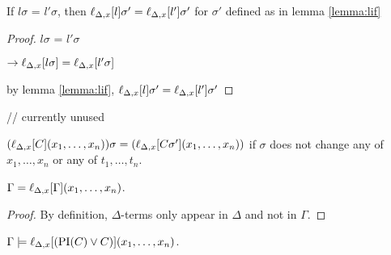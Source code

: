 \documentclass[,%
	paper=a4,%
	DIV14, 
	liststotoc,
	bibtotoc,
	draft=false,%
	numbers=noendperiod
]{scrartcl}
\newcommand{\lif}[1]{\lift{\Delta}{#1}{x}}
\begin{document}
\begin{lemma}
	\label{lemma:lif_literal}
	If $l\sigma$ = $l'\sigma$, then $\lif{l}\sigma' = \lif{l'}\sigma'$ for $\sigma'$ defined as in lemma \ref{lemma:lif}
\end{lemma}
\begin{proof}
	$l\sigma$ = $l'\sigma$

	$\ra \lif{l\sigma} = \lif{l'\sigma}$

	by lemma \ref{lemma:lif}, 
	$\lif{l}\sigma' = \lif{l'}\sigma'$

\end{proof}

\begin{lemma} // currently unused

	$(\lif{C}(x_1, \ldots, x_n))\sigma =
	(\lif{C\sigma'}(x_1, \ldots, x_n))$ if $\sigma$ does not change any of $x_1, \ldots, x_n$ or any of $t_1, \ldots, t_n$.\qedhere


\end{lemma}

\begin{prop}
	$\Gamma = \lif{\Gamma}(x_1, \ldots, x_n)$.
\end{prop}
\begin{proof}
	By definition, $\Delta$-terms only appear in $\Delta$ and not in $\Gamma$. 
\end{proof}

\begin{lemma} $ \Gamma \entails \lif{(\PI(C) \lor C)}(x_1, \ldots, x_n) $.
	\label{lemma:gamma_entails_interpolant}
\end{lemma}
\end{document}
